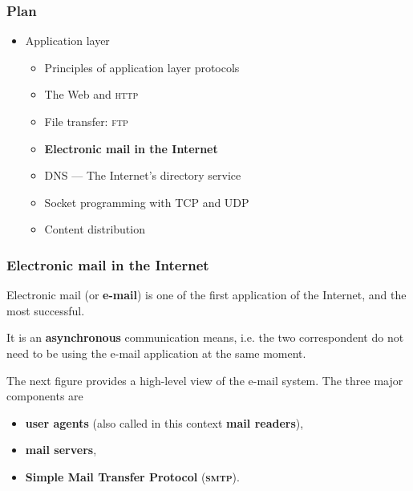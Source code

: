 
%
\begin{frame}
\frametitle{Plan}

\begin{itemize}

  \item Application layer

  \begin{itemize}

    \item Principles of application layer protocols

    \item The Web and \textsc{http}

    \item File transfer: \textsc{ftp}

    \item \textbf{Electronic mail in the Internet}

    \item DNS --- The Internet's directory service

    \item Socket programming with TCP and UDP

    \item Content distribution

  \end{itemize}

\end{itemize}

\end{frame}

%
\begin{frame}
\frametitle{Electronic mail in the Internet}

Electronic mail (or \textbf{e-mail}) is one of the first application
of the Internet, and the most successful.

It is an \textbf{asynchronous} communication means, i.e. the two
correspondent do not need to be using the e-mail application at the
same moment.

The next figure provides a high-level view of the e-mail system. The
three major components are 
\begin{itemize}

  \item \textbf{user agents} (also called in this context
  \textbf{mail readers}),

  \item \textbf{mail servers},

  \item \textbf{Simple Mail Transfer Protocol} (\textbf{\textsc{smtp}}).

\end{itemize}


\end{frame}

